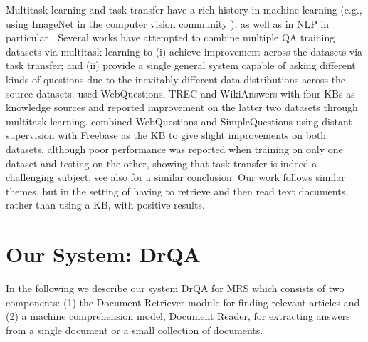 \documentclass[11pt,a4paper]{article}
\newcommand\us{DrQA\xspace}
\newcommand\usp{Document Reader\xspace}
\begin{document}
Multitask learning \cite{caruana1998multitask} and task transfer have a rich history in machine learning (e.g., using ImageNet in the computer vision community \cite{huh2016makes}),
as well as in NLP in particular \cite{Collobert08}.
Several works have attempted to combine multiple QA training datasets via multitask learning to (i) achieve improvement across the datasets via task transfer; and (ii) provide a single general system capable of asking different kinds of questions due to the inevitably different data distributions across the source datasets. \citet{fader2014open} used WebQuestions, TREC and WikiAnswers with four KBs as knowledge sources and reported improvement on the latter two datasets through multitask learning.
\citet{bordes2015large} combined WebQuestions and SimpleQuestions using distant supervision with Freebase as the KB to give slight improvements on both datasets, although poor performance was reported when training on only one dataset and testing on the other, showing that task transfer is indeed a challenging subject; see also \cite{kadlecparticular} for a similar conclusion.
Our work follows similar themes, but in the setting of having to retrieve and then read text documents, rather than using a KB, with positive results.



\section{Our System: \us} \label{sec:model}

In the following we describe our system \us for MRS which consists of two components: (1) the Document Retriever module for finding relevant articles and (2) a machine comprehension model, \usp, for extracting answers from a single document or a small collection of documents.
\end{document}
